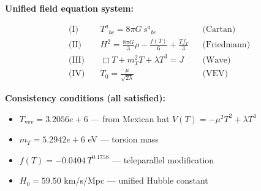 
\textbf{Unified field equation system:}

\begin{align}
  \text{(I)} \quad & T^a{}_{bc} = 8\pi G \, s^a{}_{bc} && \text{(Cartan)} \\
  \text{(II)} \quad & H^2 = \frac{8\pi G}{3}\rho - \frac{f(T)}{6} + \frac{Tf_T}{3} && \text{(Friedmann)} \\
  \text{(III)} \quad & \Box T + m_T^2 T + \lambda T^3 = J && \text{(Wave)} \\
  \text{(IV)} \quad & T_0 = \frac{\mu}{\sqrt{2\lambda}} && \text{(VEV)}
\end{align}

\textbf{Consistency conditions (all satisfied):}
\begin{itemize}
  \item $T_{\text{vev}} = 3.2056e+6$ — from Mexican hat $V(T) = -\mu^2 T^2 + \lambda T^4$
  \item $m_T = 5.2942e+6$ eV — torsion mass
  \item $f(T) = -0.0404 \, T^{0.1758}$ — teleparallel modification
  \item $H_0 = 59.50$ km/s/Mpc — unified Hubble constant
\end{itemize}